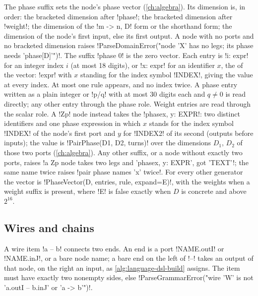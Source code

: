 The phase suffix sets the node's phase vector (\cref{ch:algebra}). Its dimension is, in order: the bracketed dimension after \code!phase!; the bracketed dimension after \code!weight!; the dimension of the \code!m -> n, D! form or the shorthand form; the dimension of the node's first input, else its first output. A node with no ports and no bracketed dimension raises \code!ParseDomainError("node 'X' has no legs; its phase needs 'phase[D]'")!. The suffix \code!phase 0! is the zero vector. Each entry is \code!i: expr! for an integer index $i$ (at most 18 digits), or \code!x: expr! for an identifier $x$, the  of the vector: \code!expr! with $x$ standing for the index symbol \py!INDEX!, giving the value at every index. At most one rule appears, and no index twice. A phase entry written as a plain integer or \code!p/q! with at most 30 digits each and $q\ne0$ is read directly; any other entry through the phase role. Weight entries are read through the scalar role. A \code!Zp! node instead takes the  \code!phase{x, y: EXPR}!: two distinct identifiers and one phase expression in which $x$ stands for the index symbol \py!INDEX! of the node's first port and $y$ for \py!INDEX2! of its second (outputs before inputs); the value is \py!PairPhase(D1, D2, turns)! over the dimensions $D_1$, $D_2$ of those two ports (\cref{ch:algebra}). Any other suffix, or a node without exactly two ports, raises \code!a Zp node takes two legs and 'phase{x, y: EXPR}', got 'TEXT'!; the same name twice raises \code!pair phase names 'x' twice!. For every other generator the vector is \py!PhaseVector(D, entries, rule, expand=E)!, with the weights when a weight suffix is present, where \code!E! is false exactly when $D$ is concrete and above $2^{16}$.

\subsection{Wires and chains}\label{sec:language-dsl-wires}

A wire item \code!a -- b! connects two ends. An end is a port \code!NAME.outI! or \code!NAME.inJ!, or a bare node name; a bare end on the left of \code!--! takes an output of that node, on the right an input, as \cref{alg:language-dsl-build} assigns. The item must have exactly two nonempty sides, else \code!ParseGrammarError("wire 'W' is not 'a.outI -- b.inJ' or 'a -> b'")!.

